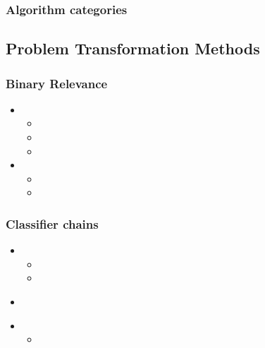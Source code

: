 \documentclass{beamer}
\begin{document}
\begin{frame}
\frametitle{Algorithm categories}

\end{frame}

\subsection{Problem Transformation Methods}

\begin{frame}
\frametitle{Binary Relevance}

\begin{itemize}
\item <2-> 
\begin{itemize}
\item <3-> 
\item <4-> 
\item <5-> 
\end{itemize}
\item <6-> 
\begin{itemize}
\item <7-> 
\item <8-> 
\end{itemize}
\end{itemize}
\end{frame}

\begin{frame}
\frametitle{Classifier chains}
\begin{itemize}
\item <2-> 
\begin{itemize}
\item 
\item <4-> 
\end{itemize}
\end{itemize}
\begin{itemize}
\item<5-> 
\end{itemize}

\begin{itemize}
\item <7-> 
\begin{itemize}
\item <8-> 
\end{itemize}
\end{itemize}
\end{frame}
\end{document}
